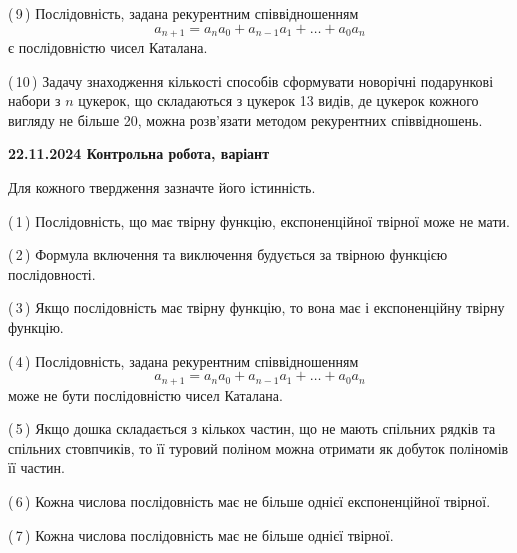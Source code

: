 \documentclass[12pt, ukrainian]{article}
\begin{document}
\begin {large}
\begin {large}
\begin {large}
\begin {large}
\begin {large}
\begin {large}
\begin {large}
\begin {large}
\begin {large}
\begin {large}
\begin {large}
\begin {large}
\begin {large}
\begin {large}
\begin {large}
\begin {large}
\begin {large}
\begin {large}
\begin {large}
\begin {large}
\begin {large}
\begin {large}
\begin {large}
\begin {large}
\begin {large}
\begin {large}
\begin {large}
\begin {large}
\begin {large}
\begin {large}
{(\,9\,) Послідовність, задана рекурентним співвідношенням $$a_{n+1}=a_{n}a_{0}+a_{n-1}a_{1}+\ldots+a_0a_{n}$$ є послідовністю чисел Каталана.%



(\,10\,) Задачу знаходження кількості способів сформувати новорічні подарункові набори з $n$ цукерок, що складаються з цукерок 13 видів, де цукерок кожного вигляду не більше 20, можна розв’язати методом рекурентних співвідношень.%




\vspace{5mm}
}
\newpage

\begin {large}

\textbf{22.11.2024 Контрольна робота, варіант  }\par


{
Для кожного твердження зазначте його істинність.\par

\vspace{2mm}

(\,1\,) Послідовність, що має твірну функцію, експоненційної твірної може не мати.%



(\,2\,) Формула включення та виключення будується за твірною функцією послідовності.%



(\,3\,) Якщо послідовність має твірну функцію, то вона має і експоненційну твірну функцію.%



(\,4\,) Послідовність, задана рекурентним співвідношенням $$a_{n+1}=a_{n}a_{0}+a_{n-1}a_{1}+\ldots+a_0a_{n}$$ може не бути послідовністю чисел Каталана.%



(\,5\,) Якщо дошка складається з кількох частин, що не мають спільних рядків та спільних стовпчиків, то її туровий поліном можна отримати як добуток поліномів її частин.%



(\,6\,) Кожна числова послідовність має не більше однієї  експоненційної твірної.%



(\,7\,) Кожна числова послідовність має не більше однієї твірної.%



}
\end{large}
\end{large}
\end{large}
\end{large}
\end{large}
\end{large}
\end{large}
\end{large}
\end{large}
\end{large}
\end{large}
\end{large}
\end{large}
\end{large}
\end{large}
\end{large}
\end{large}
\end{large}
\end{large}
\end{large}
\end{large}
\end{large}
\end{large}
\end{large}
\end{large}
\end{large}
\end{large}
\end{large}
\end{large}
\end{large}
\end{large}
\end{document}
